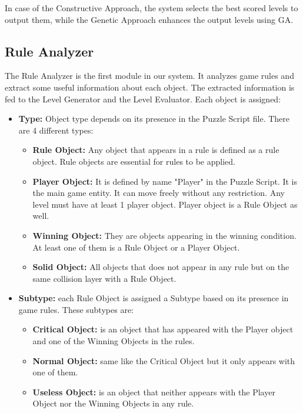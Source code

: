 In case of the Constructive Approach, the system selects the best scored levels to output them, while the Genetic Approach enhances the output levels using GA.

\subsection{Rule Analyzer}
The Rule Analyzer is the first module in our system. It analyzes game rules and extract some useful information about each object. The extracted information is fed to the Level Generator and the Level Evaluator. Each object is assigned:
\begin{itemize}
	\item \textbf{Type:} Object type depends on its presence in the Puzzle Script file. There are 4 different types:
	\begin{itemize} \itemsep0pt \parskip0pt 
		\item \textbf{Rule Object:} Any object that appears in a rule is defined as a rule object. Rule objects are essential for rules to be applied.
		\item \textbf{Player Object:} It is defined by name "Player" in the Puzzle Script. It is the main game entity. It can move freely without any restriction. Any level must have at least 1 player object. Player object is a Rule Object as well.
		\item \textbf{Winning Object:} They are objects appearing in the winning condition. At least one of them is a Rule Object or a Player Object.
		\item \textbf{Solid Object:} All objects that does not appear in any rule but on the same collision layer with a Rule Object.
	\end{itemize}
	\item \textbf{Subtype:} each Rule Object is assigned a Subtype based on its presence in game rules. These subtypes are:
	\begin{itemize} \itemsep0pt \parskip0pt 
		\item \textbf{Critical Object:} is an object that has appeared with the Player object and one of the Winning Objects in the rules.
		\item \textbf{Normal Object:} same like the Critical Object but it only appears with one of them.
		\item \textbf{Useless Object:} is an object that neither appears with the Player Object nor the Winning Objects in any rule.
	\end{itemize}

\end{itemize}
